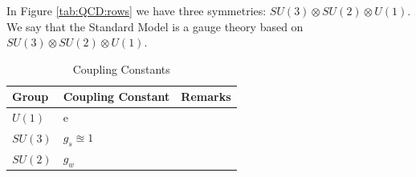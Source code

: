 \documentclass[]{article}
\begin{document}
In Figure \ref{tab:QCD:rows} we have three symmetries: $SU(3) \otimes SU(2) \otimes U(1)$. We say that the Standard Model is a gauge theory based on  $SU(3) \otimes SU(2) \otimes U(1)$.

\begin{table}[H]
	\begin{center}
		\caption{Coupling Constants}
		\begin{tabular}{|l|l|l|} \hline
			Group&Coupling Constant&Remarks \\ \hline
			$U(1)$&e& \\ \hline
			$SU(3)$&$g_s \approxeq 1$& \\ \hline
			$SU(2)$&$g_w$& \\ \hline
		\end{tabular}
	\end{center}
\end{table}
\end{document}

